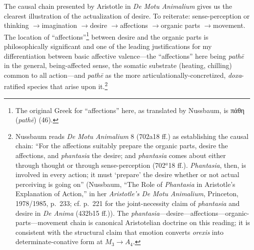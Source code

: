 \documentclass{article}
\newcommand{\gk}[1]{{\greekfont #1}}
\newcommand{\ra}{\ensuremath{\rightarrow}}
\begin{document}
The causal chain presented by Aristotle in \textit{De Motu Animalium} gives us the clearest illustration of the actualization of desire. To reiterate: sense-perception or thinking \ra imagination \ra desire \ra affections \ra organic parts \ra movement. The location of ``affections''\footnote{The original Greek for ``affections'' here, as translated by Nussbaum, is \gk{πάθη} (\textit{pathē}) (46).} between desire and the organic parts is philosophically significant and one of the leading justifications for my differentiation between basic affective valence---the ``affections'' here being \textit{pathē} in the general, being-affected sense, the somatic substrate (heating, chilling) common to all action---and \textit{pathē} as the more articulationally-concretized, \textit{doxa}-ratified species that arise upon it.\footnote{Nussbaum reads \textit{De Motu Animalium} 8 (702a18 ff.) as establishing the causal chain: ``For the affections suitably prepare the organic parts, desire the affections, and \textit{phantasia} the desire; and \textit{phantasia} comes about either through thought or through sense-perception (702$^{a}$18 ff.). \textit{Phantasia}, then, is involved in every action; it must `prepare' the desire whether or not actual perceiving is going on'' (Nussbaum, ``The Role of \textit{Phantasia} in Aristotle's Explanation of Action,'' in her \textit{Aristotle's De Motu Animalium}, Princeton, 1978/1985, p.~233; cf. p.~221 for the joint-necessity claim of \textit{phantasia} and desire in \textit{De Anima} (432b15 ff.)). The \textit{phantasia}---desire---affections---organic-parts---movement chain is canonical Aristotelian doctrine on this reading; it is consistent with the structural claim that emotion converts \textit{orexis} into determinate-conative form at $M_3 \rightarrow A_4$.}
\end{document}
